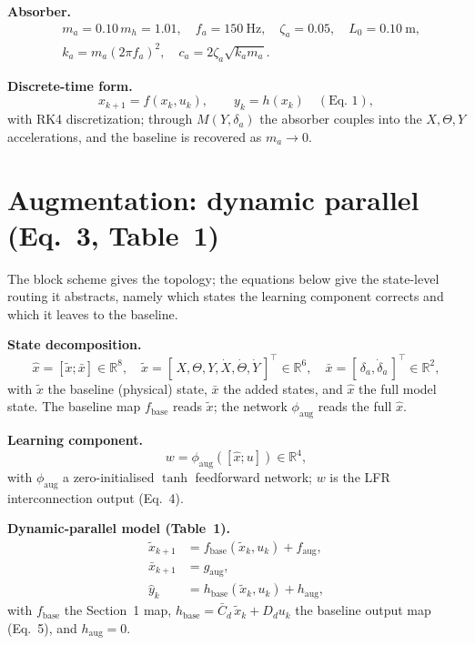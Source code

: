 \documentclass[11pt]{article}
\newcommand{\R}{\mathbb{R}}
\newcommand{\xb}{\tilde{x}}
\newcommand{\xa}{\bar{x}}
\newcommand{\xh}{\hat{x}}
\newcommand{\yh}{\hat{y}}
\newcommand{\Cbar}{\bar{C}_d}
\newcommand{\fb}{f_{\mathrm{base}}}
\newcommand{\hb}{h_{\mathrm{base}}}
\newcommand{\fa}{f_{\mathrm{aug}}}
\newcommand{\ga}{g_{\mathrm{aug}}}
\newcommand{\ha}{h_{\mathrm{aug}}}
\begin{document}
\medskip\noindent\textbf{Absorber.}
\begin{equation}
  \begin{aligned}
    & m_a = 0.10\,m_h = 1.01 , \quad
      f_a = 150\ \mathrm{Hz} , \quad
      \zeta_a = 0.05 , \quad
      L_0 = 0.10\ \mathrm{m} , \\
    & k_a = m_a(2\pi f_a)^2 , \quad
      c_a = 2\zeta_a\sqrt{k_a m_a} .
  \end{aligned}
  \label{eq:sys-absorber}
\end{equation}

\medskip\noindent\textbf{Discrete-time form.}
\begin{equation}
  x_{k+1} = f(x_k,u_k) , \qquad y_k = h(x_k) \quad (\text{Eq.\ 1}) ,
  \label{eq:sys-io}
\end{equation}
with RK4 discretization; through $M(Y,\delta_a)$ the absorber couples into the $X,\Theta,Y$
accelerations, and the baseline is recovered as $m_a \to 0$.

\section{Augmentation: dynamic parallel \quad (Eq.~3, Table~1)}

The block scheme gives the topology; the equations below give the state-level routing it
abstracts, namely which states the learning component corrects and which it leaves to the
baseline.

\medskip\noindent\textbf{State decomposition.}
\begin{equation}
  \xh = [\xb;\xa] \in \R^8 , \quad
  \xb = [\,X,\Theta,Y,\dot X,\dot\Theta,\dot Y\,]^\top \in \R^6 , \quad
  \xa = [\,\delta_a,\dot\delta_a\,]^\top \in \R^2 ,
  \label{eq:aug-state}
\end{equation}
with $\xb$ the baseline (physical) state, $\xa$ the added states, and $\xh$ the full model
state. The baseline map $\fb$ reads $\xb$; the network $\phi_{\mathrm{aug}}$ reads the full
$\xh$.

\medskip\noindent\textbf{Learning component.}
\begin{equation}
  w = \phi_{\mathrm{aug}}([\xh;u]) \in \R^4 ,
  \label{eq:aug-ann}
\end{equation}
with $\phi_{\mathrm{aug}}$ a zero-initialised $\tanh$ feedforward network; $w$ is the LFR
interconnection output (Eq.~4).

\medskip\noindent\textbf{Dynamic-parallel model (Table~1).}
\begin{align}
  \xb_{k+1} &= \fb(\xb_k,u_k) + \fa , \label{eq:aug-xb}\\
  \xa_{k+1} &= \ga , \label{eq:aug-xa}\\
  \yh_k     &= \hb(\xb_k,u_k) + \ha , \label{eq:aug-y}
\end{align}
with $\fb$ the Section~1 map, $\hb = \Cbar\,\xb_k + D_d u_k$ the baseline output map (Eq.~5),
and $\ha = 0$.
\end{document}
